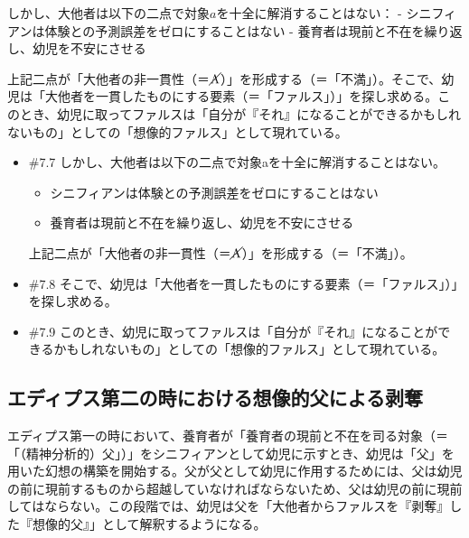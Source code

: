 しかし、大他者は以下の二点で対象\(a\)を十全に解消することはない： -
シニフィアンは体験との予測誤差をゼロにすることはない -
養育者は現前と不在を繰り返し、幼児を不安にさせる

上記二点が「大他者の非一貫性（＝\(\cancel{\textrm{A}}\)）」を形成する（＝「不満」）。そこで、幼児は「大他者を一貫したものにする要素（＝「ファルス」）」を探し求める。このとき、幼児に取ってファルスは「自分が『それ』になることができるかもしれないもの」としての「想像的ファルス」として現れている。

\begin{note}{}
  \begin{itemize}
    \tightlist
    \item{\#7.7}
      しかし、大他者は以下の二点で対象aを十全に解消することはない。
      \begin{itemize}
          \tightlist
          \item
          シニフィアンは体験との予測誤差をゼロにすることはない
          \item
          養育者は現前と不在を繰り返し、幼児を不安にさせる
        \end{itemize}
      上記二点が「大他者の非一貫性（＝$\cancel{\textrm{A}}$）」を形成する（＝「不満」）。
    \item{\#7.8}
      そこで、幼児は「大他者を一貫したものにする要素（＝「ファルス」）」を探し求める。
    \item{\#7.9}
      このとき、幼児に取ってファルスは「自分が『それ』になることができるかもしれないもの」としての「想像的ファルス」として現れている。
  \end{itemize}
\end{note}

\subsection{エディプス第二の時における想像的父による剥奪}\label{ux30a8ux30c7ux30a3ux30d7ux30b9ux7b2cux4e8cux306eux6642ux306bux304aux3051ux308bux60f3ux50cfux7684ux7236ux306bux3088ux308bux5265ux596a}

エディプス第一の時において、養育者が「養育者の現前と不在を司る対象（＝「（精神分析的）父」）」をシニフィアンとして幼児に示すとき、幼児は「父」を用いた幻想の構築を開始する。父が父として幼児に作用するためには、父は幼児の前に現前するものから超越していなければならないため、父は幼児の前に現前してはならない。この段階では、幼児は父を「大他者からファルスを『剥奪』した『想像的父』」として解釈するようになる。

